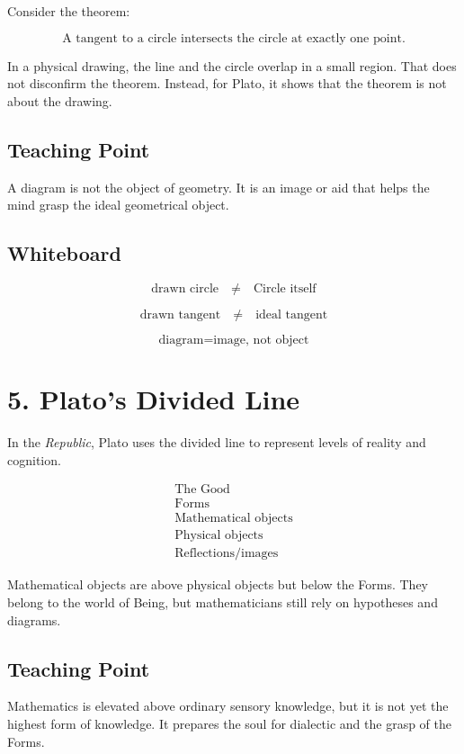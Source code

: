\documentclass[11pt]{article}
\begin{document}
Consider the theorem:

\[
\text{A tangent to a circle intersects the circle at exactly one point.}
\]

In a physical drawing, the line and the circle overlap in a small region. That does not
disconfirm the theorem. Instead, for Plato, it shows that the theorem is not about the
drawing.

\subsection*{Teaching Point}

A diagram is not the object of geometry. It is an image or aid that helps the mind grasp the
ideal geometrical object.

\subsection*{Whiteboard}

\[
\text{drawn circle}
\quad \neq \quad
\text{Circle itself}
\]

\[
\text{drawn tangent}
\quad \neq \quad
\text{ideal tangent}
\]

\[
\text{diagram} = \text{image, not object}
\]

\section*{5. Plato's Divided Line}

In the \emph{Republic}, Plato uses the divided line to represent levels of reality and cognition.

\[
\begin{array}{c}
\text{The Good} \\
\hline
\text{Forms} \\
\hline
\text{Mathematical objects} \\
\hline
\text{Physical objects} \\
\hline
\text{Reflections/images}
\end{array}
\]

Mathematical objects are above physical objects but below the Forms. They belong to the
world of Being, but mathematicians still rely on hypotheses and diagrams.

\subsection*{Teaching Point}

Mathematics is elevated above ordinary sensory knowledge, but it is not yet the highest
form of knowledge. It prepares the soul for dialectic and the grasp of the Forms.
\end{document}
